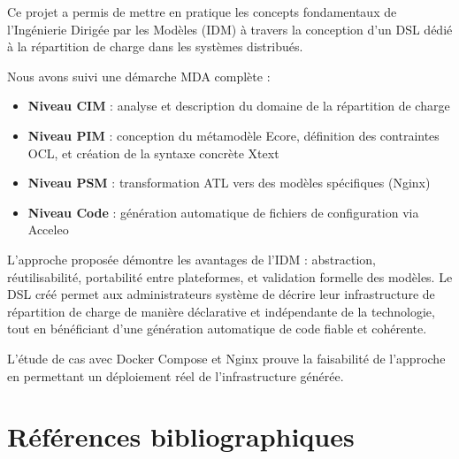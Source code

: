 \documentclass[12pt,a4paper]{report}
\begin{document}
Ce projet a permis de mettre en pratique les concepts fondamentaux de l'Ingénierie Dirigée par les Modèles (IDM) à travers la conception d'un DSL dédié à la répartition de charge dans les systèmes distribués.

Nous avons suivi une démarche MDA complète :
\begin{itemize}
  \item \textbf{Niveau CIM} : analyse et description du domaine de la répartition de charge
  \item \textbf{Niveau PIM} : conception du métamodèle Ecore, définition des contraintes OCL, et création de la syntaxe concrète Xtext
  \item \textbf{Niveau PSM} : transformation ATL vers des modèles spécifiques (Nginx)
  \item \textbf{Niveau Code} : génération automatique de fichiers de configuration via Acceleo
\end{itemize}

L'approche proposée démontre les avantages de l'IDM : abstraction, réutilisabilité, portabilité entre plateformes, et validation formelle des modèles. Le DSL créé permet aux administrateurs système de décrire leur infrastructure de répartition de charge de manière déclarative et indépendante de la technologie, tout en bénéficiant d'une génération automatique de code fiable et cohérente.

L'étude de cas avec Docker Compose et Nginx prouve la faisabilité de l'approche en permettant un déploiement réel de l'infrastructure générée.

\chapter*{Références bibliographiques}
\end{document}
